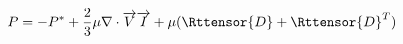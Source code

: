 \begin{equation}
  P = -P^* + \frac{2}{3}\mu \nabla\cdot\overrightarrow{V}\overrightarrow{I} + \mu ( \Rttensor{D} + \Rttensor{D}^T )
\end{equation}

